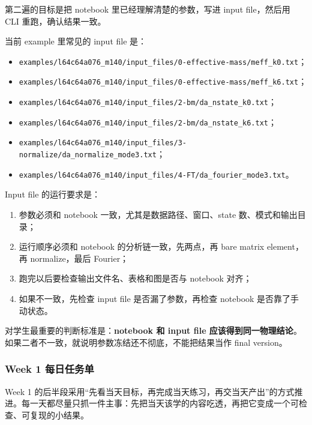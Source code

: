 \documentclass[11pt,a4paper,fontset=fandol]{ctexart}
\begin{document}
第二遍的目标是把 notebook 里已经理解清楚的参数，写进 input file，然后用 CLI 重跑，确认结果一致。

当前 example 里常见的 input file 是：

\begin{itemize}[leftmargin=2em]
  \item \lstinline|examples/l64c64a076_m140/input_files/0-effective-mass/meff_k0.txt|；
  \item \lstinline|examples/l64c64a076_m140/input_files/0-effective-mass/meff_k6.txt|；
  \item \lstinline|examples/l64c64a076_m140/input_files/2-bm/da_nstate_k0.txt|；
  \item \lstinline|examples/l64c64a076_m140/input_files/2-bm/da_nstate_k6.txt|；
  \item \lstinline|examples/l64c64a076_m140/input_files/3-normalize/da_normalize_mode3.txt|；
  \item \lstinline|examples/l64c64a076_m140/input_files/4-FT/da_fourier_mode3.txt|。
\end{itemize}

Input file 的运行要求是：

\begin{enumerate}[leftmargin=2em]
  \item 参数必须和 notebook 一致，尤其是数据路径、窗口、state 数、模式和输出目录；
  \item 运行顺序必须和 notebook 的分析链一致，先两点，再 bare matrix element，再 normalize，最后 Fourier；
  \item 跑完以后要检查输出文件名、表格和图是否与 notebook 对齐；
  \item 如果不一致，先检查 input file 是否漏了参数，再检查 notebook 是否靠了手动状态。
\end{enumerate}

对学生最重要的判断标准是：\textbf{notebook 和 input file 应该得到同一物理结论}。如果二者不一致，就说明参数冻结还不彻底，不能把结果当作 final version。

\subsubsection{Week 1 每日任务单}

Week 1 的后半段采用“先看当天目标，再完成当天练习，再交当天产出”的方式推进。每一天都尽量只抓一件主事：先把当天该学的内容吃透，再把它变成一个可检查、可复现的小结果。
\end{document}

